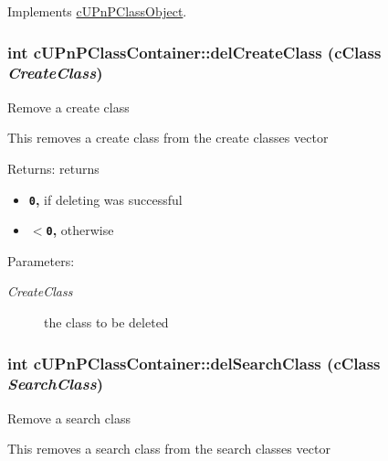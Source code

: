 Implements \hyperlink{classcUPnPClassObject_9090f5982129bc5aa15c6e19db627445}{cUPnPClassObject}.\hypertarget{classcUPnPClassContainer_23c2949d1cb925423a6b113cf0021a5f}{
\subsubsection[{delCreateClass}]{\setlength{\rightskip}{0pt plus 5cm}int cUPnPClassContainer::delCreateClass ({\bf cClass} {\em CreateClass})}}
\label{classcUPnPClassContainer_23c2949d1cb925423a6b113cf0021a5f}


Remove a create class

This removes a create class from the create classes vector

\begin{Desc}
\item[Returns:]returns\begin{itemize}
\item {\bf {\tt 0},} if deleting was successful\item {\bf {\tt $<$0},} otherwise \end{itemize}
\end{Desc}
\begin{Desc}
\item[Parameters:]
\begin{description}
\item[{\em CreateClass}]the class to be deleted \end{description}
\end{Desc}
\hypertarget{classcUPnPClassContainer_3cfb0c2035e678cde990631b804d4ab2}{
\subsubsection[{delSearchClass}]{\setlength{\rightskip}{0pt plus 5cm}int cUPnPClassContainer::delSearchClass ({\bf cClass} {\em SearchClass})}}
\label{classcUPnPClassContainer_3cfb0c2035e678cde990631b804d4ab2}


Remove a search class

This removes a search class from the search classes vector

